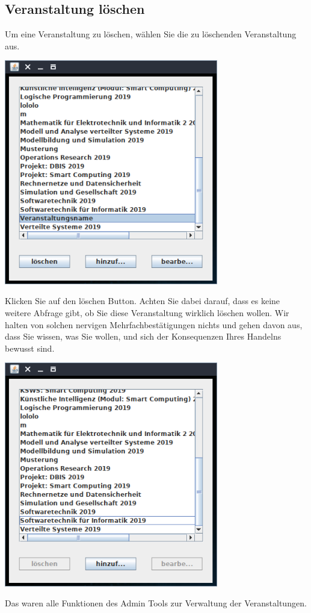 \documentclass{Handbuch}
\begin{document}
\subsection{Veranstaltung löschen}
Um eine Veranstaltung zu löschen, wählen Sie die zu löschenden Veranstaltung aus.
\begin{center}
	\includegraphics[width=0.7\textwidth]{img_adminGUI_11.png}
\end{center}
Klicken Sie auf den \frqq löschen\flqq{} Button. Achten Sie dabei darauf, dass es keine weitere Abfrage gibt, ob Sie diese Veranstaltung wirklich löschen wollen. Wir halten von solchen nervigen Mehrfachbestätigungen nichts und gehen davon aus, dass Sie wissen, was Sie wollen, und sich der Konsequenzen Ihres Handelns bewusst sind.
\begin{center}
	\includegraphics[width=0.7\textwidth]{img_adminGUI_12.png}
\end{center}
Das waren alle Funktionen des Admin Tools zur Verwaltung der Veranstaltungen.
\end{document}
